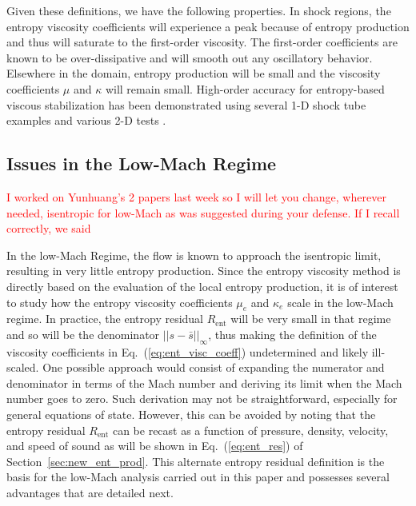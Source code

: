 \documentclass[preprint,10pt]{elsarticle}
\newcommand{\resi}{R_\text{ent}}
\newcommand{\eqt}[1]{Eq.~(\ref{#1})}                     %
\newcommand{\sct}[1]{Section~\ref{#1}}                   %
\newcommand{\tcr}[1]{\textcolor{red}{#1}}
\begin{document}
%
Given these definitions, we have the following properties.
In shock regions, the entropy viscosity coefficients will experience a peak because of entropy production and thus 
will saturate to the first-order viscosity. The first-order coefficients are known to be over-dissipative and will 
smooth out any oscillatory behavior. Elsewhere in the domain, entropy production will be small and the viscosity 
coefficients $\mu$ and $\kappa$ will remain small. %
High-order accuracy for entropy-based viscous stabilization has been demonstrated using several 1-D shock tube 
examples and various 2-D tests \cite{jlg1, jlg2, valentin}.

\subsection{Issues in the Low-Mach Regime} 
\tcr{I worked on Yunhuang's 2 papers last week so I will let you change, wherever needed, isentropic for 
low-Mach as was suggested during your defense. If I recall correctly, we said }

In the low-Mach Regime, the flow is known to approach the isentropic limit, resulting in very little 
entropy production. Since the entropy viscosity method is directly based on the evaluation of the 
local entropy production, it is of interest to study how the entropy viscosity coefficients $\mu_e$ 
and $\kappa_e$ scale in the low-Mach regime. In practice, the entropy residual $\resi$ will be very 
small in that regime and so will be the denominator $|| s - \bar{s} ||_\infty$, thus making the 
definition of the viscosity coefficients in \eqt{eq:ent_visc_coeff} undetermined and likely ill-scaled.  
One possible approach would consist of expanding the numerator and denominator in terms of the Mach number 
and deriving its limit when the Mach number goes to zero. Such derivation may not be straightforward, 
especially for general equations of state. However, this can be avoided by noting that the entropy 
residual $\resi$ can be recast as a function of pressure, density, velocity, and speed of sound as 
will be shown in \eqt{eq:ent_res} of \sct{sec:new_ent_prod}. This alternate entropy residual definition 
is the basis for the low-Mach analysis carried out in this paper and possesses several advantages that 
are detailed next. %
\end{document}
